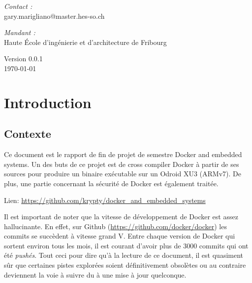 \documentclass[11pt,a4paper,oneside]{report}
\newcommand{\school}{Haute École d'ingénierie et d'architecture de Fribourg}
\begin{document}
\begin{titlepage}
\begin{center}
\vfill

\noindent
\begin{minipage}{0.4\textwidth}
  \begin{flushleft} \large
    \emph{Contact :}\\
    gary.marigliano@master.hes-so.ch
  \end{flushleft}
\end{minipage}%
\begin{minipage}{0.4\textwidth}
  \begin{flushright} \large
    \emph{Mandant :} \\
    \school
  \end{flushright}
\end{minipage}

\vfill

{\large Version 0.0.1 \\ \today}

\end{center}
\end{titlepage}

\pagestyle{historystyle}
\begin{versionhistory}  
\end{versionhistory}


\tableofcontents
{}

\pagestyle{normal}

\chapter{Introduction}

\section{Contexte}\label{contexte}

Ce document est le rapport de fin de projet de semestre Docker and embedded systems. Un des buts de ce projet est de cross compiler Docker à partir de ses sources pour produire un binaire exécutable sur un Odroid XU3 (ARMv7). De plus, une partie concernant la sécurité de Docker est également traitée.

Lien: \url{https://github.com/krypty/docker_and_embedded_systems}

Il est important de noter que la vitesse de développement de Docker est assez hallucinante. En effet, sur Github (\url{https://github.com/docker/docker}) les commits se succèdent à vitesse grand V. Entre chaque version de Docker qui sortent environ tous les mois, il est courant d'avoir plus de 3000 commits qui ont été \emph{pushés}. Tout ceci pour dire qu'à la lecture de ce document, il est quasiment sûr que certaines pistes explorées soient définitivement obsolètes ou au contraire deviennent la voie à suivre du à une mise à jour quelconque.
\end{document}
